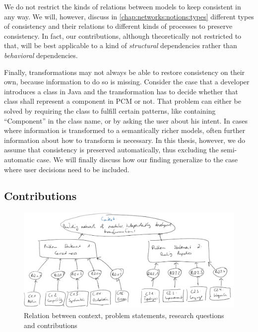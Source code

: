 We do not restrict the kinds of relations between models to keep consistent  in any way.
We will, however, discuss in \autoref{chap:networks:notions:types} different types of consistency and their relations to different kinds of processes to preserve consistency.
In fact, our contributions, although theoretically not restricted to that, will be best applicable to a kind of \emph{structural} dependencies rather than \emph{behavioral} dependencies.

Finally, transformations may not always be able to restore consistency on their own, because information to do so is missing.
Consider the case that a developer introduces a class in Java and the transformation has to decide whether that class shall represent a component in \gls{PCM} or not.
That problem can either be solved by requiring the class to fulfill certain patterns, like containing \enquote{Component} in the class name, or by asking the user about his intent.
In cases where information is transformed to a semantically richer models, often further information about how to transform is necessary.
In this thesis, however, we do assume that consistency is preserved automatically, thus excluding the semi-automatic case.
We will finally discuss how our finding generalize to the case where user decisions need to be included.



\subsection{Contributions}

\begin{figure}
    \centering
    \includegraphics[width=\textwidth]{figures/prologue/context_problem_eq_contribution_relations.png}
    \caption[Context, problems, research questions and contributions]{Relation between context, problem statements, research questions and contributions}
    \label{fig:prologue:context_problem_eq_contribution_relations}
\end{figure}

